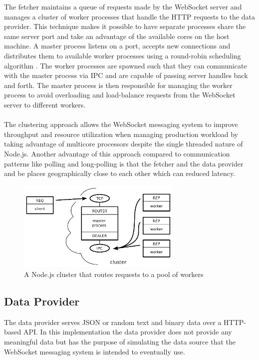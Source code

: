 The fetcher maintains a queue of requests made by the WebSocket server and manages a cluster of worker processes that handle the HTTP requests to the data provider. This technique makes it possible to have separate processes share the same server port and take an advantage of the available cores on the host machine. A master process listens on a port, accepts new connections and distributes them to available worker processes using a round-robin scheduling algorithm \cite{nodeCluster}. The worker processes are spawned such that they can communicate with the master process via IPC and are capable of passing server handles back and forth. The master process is then responsible for managing the worker process to avoid overloading and load-balance requests from the WebSocket server to different workers.
\\ \\
The clustering approach allows the WebSocket messaging system to improve throughput and resource utilization when managing production workload by taking advantage of multicore processors despite the single threaded nature of Node.js. Another advantage of this approach compared to communication patterns like polling and long-polling is that the fetcher and the data provider and be places geographically close to each other which can reduced latency.
\\
\begin{figure}[h!]
	\centering
	\label{fig:webSocketMessagingSystem}\includegraphics[width=0.7\textwidth]{images/poolOfWorkers}
	\caption{A Node.js cluster that routes requests to a pool of workers \cite{judd2008node}}
\end{figure}

\subsection{Data Provider}

The data provider serves JSON or random text and binary data over a HTTP-based API. In this implementation the data provider does not provide any meaningful data but has the purpose of simulating the data source that the WebSocket messaging system is intended to eventually use.

